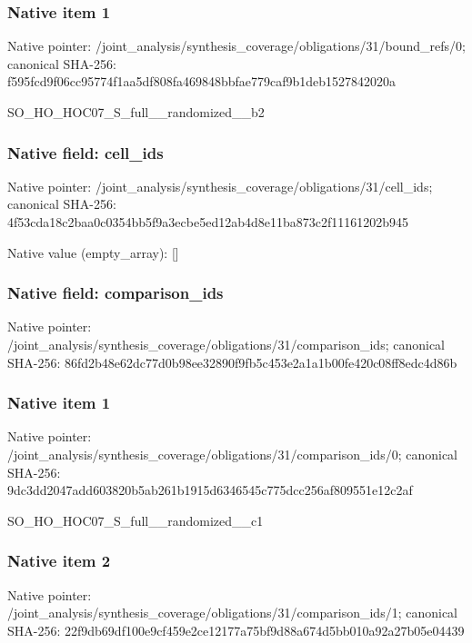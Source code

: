 \documentclass[10pt,a4paper]{article}
\begin{document}
\subsubsection{Native item 1}
Native pointer: /joint\_\allowbreak{}analysis/synthesis\_\allowbreak{}coverage/obligations/31/bound\_\allowbreak{}refs/0; canonical SHA-256: f595fcd9f06cc95774f1aa5df808fa469848bbfae779caf9b1deb1527842020a

\begingroup\raggedright\sloppy SO\_\allowbreak{}HO\_\allowbreak{}HOC07\_\allowbreak{}S\_\allowbreak{}full\_\allowbreak{}\_\allowbreak{}randomized\_\allowbreak{}\_\allowbreak{}b2\par\endgroup

\subsubsection{Native field: cell\_\allowbreak{}ids}
Native pointer: /joint\_\allowbreak{}analysis/synthesis\_\allowbreak{}coverage/obligations/31/cell\_\allowbreak{}ids; canonical SHA-256: 4f53cda18c2baa0c0354bb5f9a3ecbe5ed12ab4d8e11ba873c2f11161202b945

Native value (empty\_\allowbreak{}array): []

\subsubsection{Native field: comparison\_\allowbreak{}ids}
Native pointer: /joint\_\allowbreak{}analysis/synthesis\_\allowbreak{}coverage/obligations/31/comparison\_\allowbreak{}ids; canonical SHA-256: 86fd2b48e62dc77d0b98ee32890f9fb5c453e2a1a1b00fe420c08ff8edc4d86b

\subsubsection{Native item 1}
Native pointer: /joint\_\allowbreak{}analysis/synthesis\_\allowbreak{}coverage/obligations/31/comparison\_\allowbreak{}ids/0; canonical SHA-256: 9dc3dd2047add603820b5ab261b1915d6346545c775dcc256af809551e12c2af

\begingroup\raggedright\sloppy SO\_\allowbreak{}HO\_\allowbreak{}HOC07\_\allowbreak{}S\_\allowbreak{}full\_\allowbreak{}\_\allowbreak{}randomized\_\allowbreak{}\_\allowbreak{}c1\par\endgroup

\subsubsection{Native item 2}
Native pointer: /joint\_\allowbreak{}analysis/synthesis\_\allowbreak{}coverage/obligations/31/comparison\_\allowbreak{}ids/1; canonical SHA-256: 22f9db69df100e9cf459e2ce12177a75bf9d88a674d5bb010a92a27b05e04439
\end{document}
